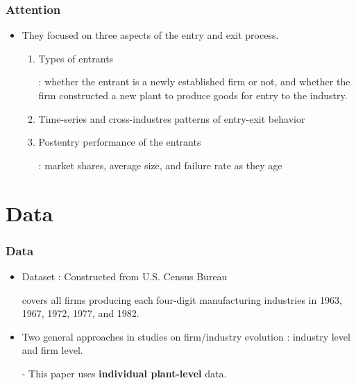 \documentclass[dvipdfmx,12pt]{beamer}
\begin{document}
\begin{frame}\frametitle{Attention}

 \begin{itemize}
 
 \item They focused on three aspects of the entry and exit process.
 
  \begin{enumerate}
  
  \item Types of entrants
  
  : whether the entrant is a newly established firm or not, and whether the firm constructed a new plant to produce goods for entry to the industry.
  
  \item Time-series and cross-industres patterns of entry-exit behavior
  
  \item Postentry performance of the entrants
  
  : market shares, average size, and failure rate as they age  
  
  \end{enumerate}
 
 \end{itemize}

\end{frame}

\section{Data}
\begin{frame}\frametitle{Data}

 \begin{itemize}
 
 \item Dataset : Constructed from U.S. Census Bureau 
 
 covers all firms producing each four-digit manufacturing industries in 1963, 1967, 1972, 1977, and 1982.
 
 \item Two general approaches in studies on firm/industry evolution : industry level and firm level.
 
 - This paper uses \textbf{individual plant-level} data.
 
 \end{itemize}

\end{frame}
\end{document}
